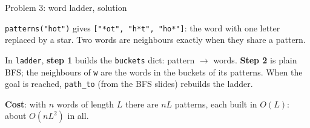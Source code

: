 \documentclass[aspectratio=169,10pt]{beamer}
\newcommand{\pycodes}[2]{}
\begin{document}
\begin{frame}[allowframebreaks]{Problem 3: word ladder, solution}
\vspace{2mm}
{\small
\texttt{patterns("hot")} gives \texttt{["*ot", "h*t", "ho*"]}: the word with one letter replaced by a star. Two words are neighbours exactly when they share a pattern.

\vspace{2mm}
In \texttt{ladder}, \textbf{step 1} builds the \texttt{buckets} dict: pattern $\to$ words. \textbf{Step 2} is plain BFS; the neighbours of \texttt{w} are the words in the buckets of its patterns. When the goal is reached, \texttt{path\_to} (from the BFS slides) rebuilds the ladder.

\vspace{2mm}
\textbf{Cost}: with $n$ words of length $L$ there are $nL$ patterns, each built in $O(L)$: about $O(nL^2)$ in all.}
\framebreak
\pycodes{\fontsize{8}{9.4}}{ladder}
\end{frame}
\end{document}
